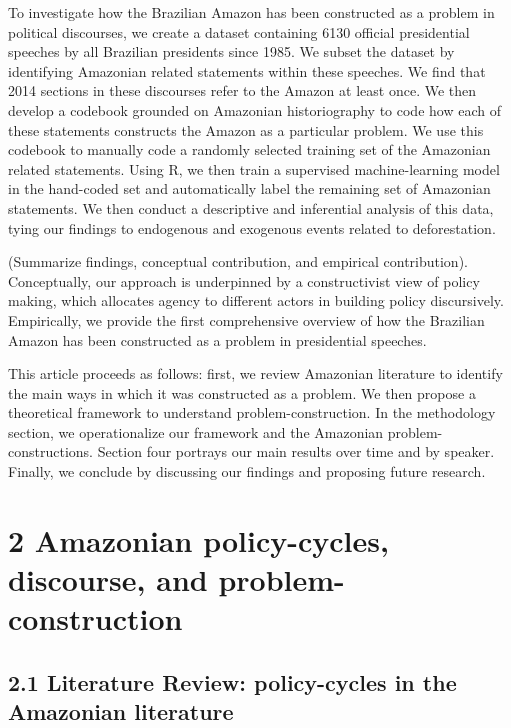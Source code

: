 \documentclass[
]{article}
\begin{document}
To investigate how the Brazilian Amazon has been constructed as a
problem in political discourses, we create a dataset containing 6130
official presidential speeches by all Brazilian presidents since 1985.
We subset the dataset by identifying Amazonian related statements within
these speeches. We find that 2014 sections in these discourses refer to
the Amazon at least once. We then develop a codebook grounded on
Amazonian historiography to code how each of these statements constructs
the Amazon as a particular problem. We use this codebook to manually
code a randomly selected training set of the Amazonian related
statements. Using R, we then train a supervised machine-learning model
in the hand-coded set and automatically label the remaining set of
Amazonian statements. We then conduct a descriptive and inferential
analysis of this data, tying our findings to endogenous and exogenous
events related to deforestation.

(Summarize findings, conceptual contribution, and empirical
contribution). Conceptually, our approach is underpinned by a
constructivist view of policy making, which allocates agency to
different actors in building policy discursively. Empirically, we
provide the first comprehensive overview of how the Brazilian Amazon has
been constructed as a problem in presidential speeches.

This article proceeds as follows: first, we review Amazonian literature
to identify the main ways in which it was constructed as a problem. We
then propose a theoretical framework to understand problem-construction.
In the methodology section, we operationalize our framework and the
Amazonian problem-constructions. Section four portrays our main results
over time and by speaker. Finally, we conclude by discussing our
findings and proposing future research.

\hypertarget{amazonian-policy-cycles-discourse-and-problem-construction}{%
\section{2 Amazonian policy-cycles, discourse, and
problem-construction}\label{amazonian-policy-cycles-discourse-and-problem-construction}}

\hypertarget{literature-review-policy-cycles-in-the-amazonian-literature}{%
\subsection{2.1 Literature Review: policy-cycles in the Amazonian
literature}\label{literature-review-policy-cycles-in-the-amazonian-literature}}
\end{document}
